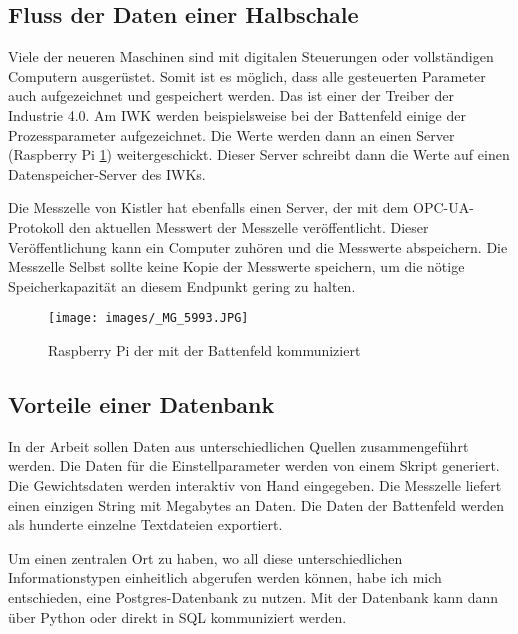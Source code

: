 \subsection{Fluss der Daten einer Halbschale}

Viele der neueren Maschinen sind mit digitalen Steuerungen oder vollständigen Computern ausgerüstet. Somit ist es möglich, dass alle gesteuerten Parameter auch aufgezeichnet und gespeichert werden. Das ist einer der Treiber der Industrie 4.0. Am IWK werden beispielsweise bei der Battenfeld einige der Prozessparameter aufgezeichnet. Die Werte werden dann an einen Server (Raspberry Pi \ref{fig:RasBlat}) weitergeschickt. Dieser Server schreibt dann die Werte auf einen Datenspeicher-Server des IWKs.

Die Messzelle von Kistler hat ebenfalls einen Server, der mit dem OPC-UA-Protokoll den aktuellen Messwert der Messzelle veröffentlicht. Dieser Veröffentlichung kann ein Computer zuhören und die Messwerte abspeichern. Die Messzelle Selbst sollte keine Kopie der Messwerte speichern, um die nötige Speicherkapazität an diesem Endpunkt gering zu halten.

\begin{figure}%
   
  \texttt{[image: images/\_MG\_5993.JPG]}
  \caption{Raspberry Pi der mit der Battenfeld kommuniziert}
  \label{fig:RasBlat}
\end{figure}

\subsection{Vorteile einer Datenbank}

In der Arbeit sollen Daten aus unterschiedlichen Quellen zusammengeführt werden. Die Daten für die Einstellparameter werden von einem Skript generiert. Die Gewichtsdaten werden interaktiv von Hand eingegeben. Die Messzelle liefert einen einzigen String mit Megabytes an Daten. Die Daten der Battenfeld werden als hunderte einzelne Textdateien exportiert.

Um einen zentralen Ort zu haben, wo all diese unterschiedlichen Informationstypen einheitlich abgerufen werden können, habe ich mich entschieden, eine Postgres-Datenbank zu nutzen. Mit der Datenbank kann dann über Python oder direkt in SQL kommuniziert werden.
